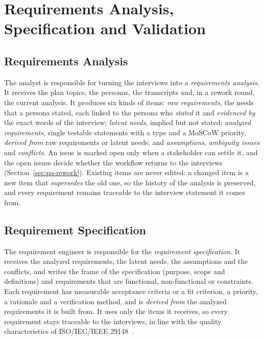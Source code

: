 \section{Requirements Analysis, Specification and Validation}
\label{sec:pa-analysis}

\subsection{Requirements Analysis}
\label{sec:pa-analyst}

The analyst is responsible for turning the interviews into a \emph{requirements analysis}. It receives the plan topics, the personas, the transcripts and, in a rework round, the current analysis. It produces six kinds of items: \emph{raw requirements}, the needs that a persona stated, each linked to the persona who \emph{stated} it and \emph{evidenced by} the exact words of the interview; \emph{latent needs}, implied but not stated; \emph{analyzed requirements}, single testable statements with a type and a MoSCoW priority, \emph{derived from} raw requirements or latent needs; and \emph{assumptions}, \emph{ambiguity issues} and \emph{conflicts}. An issue is marked open only when a stakeholder can settle it, and the open issues decide whether the workflow returns to the interviews (Section~\ref{sec:pa-rework}). Existing items are never edited: a changed item is a new item that \emph{supersedes} the old one, so the history of the analysis is preserved, and every requirement remains traceable to the interview statement it comes from.

\subsection{Requirement Specification}
\label{sec:pa-specification}

The requirement engineer is responsible for the \emph{requirement specification}. It receives the analyzed requirements, the latent needs, the assumptions and the conflicts, and writes the frame of the specification (purpose, scope and definitions) and requirements that are functional, non-functional or constraints. Each requirement has measurable acceptance criteria or a fit criterion, a priority, a rationale and a verification method, and is \emph{derived from} the analyzed requirements it is built from. It uses only the items it receives, so every requirement stays traceable to the interviews, in line with the quality characteristics of ISO/IEC/IEEE 29148~\cite{iso29148}.

